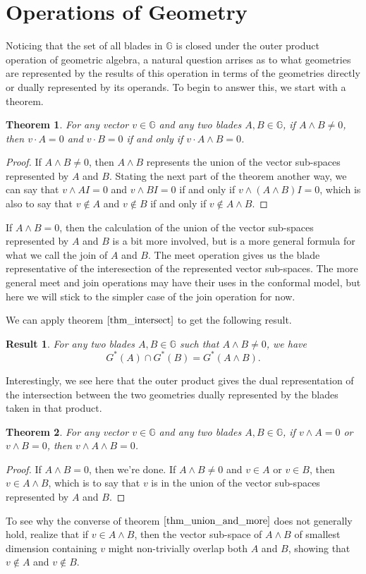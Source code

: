 \documentclass[12pt]{article}
\newcommand{\G}{\mathbb{G}}
\newtheorem{theorem}{Theorem}[section]
\newtheorem{result}{Result}[section]
\begin{document}
\section{Operations of Geometry}

Noticing that the set of all blades in $\G$ is closed under the
outer product operation of geometric algebra,
a natural question arrises as to what geometries are represented
by the results of this operation in terms of
the geometries directly or dually represented by its operands.  To begin to answer this,
we start with a theorem.
\begin{theorem}\label{thm_intersect}
For any vector $v\in\G$ and any two blades $A,B\in\G$,
if $A\wedge B\neq 0$, then $v\cdot A=0$ and $v\cdot B=0$ if and only if $v\cdot A\wedge B=0$.
\end{theorem}
\begin{proof}
If $A\wedge B\neq 0$, then $A\wedge B$ represents the union of the vector sub-spaces
represented by $A$ and $B$.  Stating the next part of the theorem another way, we can
say that $v\wedge AI=0$ and $v\wedge BI=0$ if and only if $v\wedge (A\wedge B)I=0$,
which is also to say that $v\not\in A$ and $v\not\in B$ if and only if $v\not\in A\wedge B$.
\end{proof}
If $A\wedge B=0$, then the calculation of the union of the vector sub-spaces represented by
$A$ and $B$ is a bit more involved, but is a more general formula for what we call the join
of $A$ and $B$.  The meet operation gives us the blade representative of the interesection
of the represented vector sub-spaces. The more general meet and join
operations may have their uses in the conformal model, but here we will stick to the
simpler case of the join operation for now.

We can apply theorem $\eqref{thm_intersect}$ to get the following result.
\begin{result}\label{rslt_intersect}
For any two blades $A,B\in\G$ such that $A\wedge B\neq 0$, we have
\begin{equation*}
G^*(A)\cap G^*(B) = G^*(A\wedge B).
\end{equation*}
\end{result}
Interestingly, we see here that the outer product gives the
dual representation of the intersection between the two geometries
dually represented by the blades taken in that product.
\begin{theorem}\label{thm_union_and_more}
For any vector $v\in\G$ and any two blades $A,B\in\G$,
if $v\wedge A=0$ or $v\wedge B=0$, then $v\wedge A\wedge B=0$.
\end{theorem}
\begin{proof}
If $A\wedge B=0$, then we're done.  If $A\wedge B\neq 0$ and $v\in A$ or $v\in B$,
then $v\in A\wedge B$, which is to say that $v$ is in the union of the vector sub-spaces
represented by $A$ and $B$.
\end{proof}
To see why the converse of theorem $\eqref{thm_union_and_more}$ does not generally hold,
realize that if $v\in A\wedge B$, then the vector sub-space of $A\wedge B$ of smallest dimension
containing $v$ might non-trivially overlap both $A$ and $B$, showing that $v\not\in A$ and
$v\not\in B$.
\end{document}
